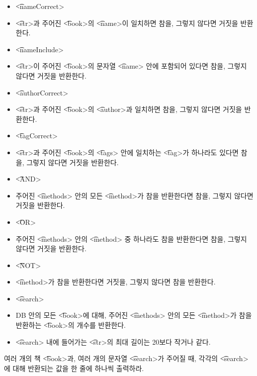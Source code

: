 \begin{itemize}
  \item \t{<nameCorrect>}
    \item \t{<str>}과 주어진 \t{<book>}의 \t{<name>}이 일치하면 참을, 그렇지 않다면 거짓을 반환한다.

  \item \t{<nameInclude>}
    \item \t{<str>}이 주어진 \t{<book>}의 문자열 \t{<name>} 안에 포함되어 있다면 참을, 그렇지 않다면 거짓을 반환한다.

  \item \t{<authorCorrect>}
    \item \t{<str>}과 주어진 \t{<book>}의 \t{<author>}과 일치하면 참을, 그렇지 않다면 거짓을 반환한다.

  \item \t{<tagCorrect>}
    \item \t{<str>}과 주어진 \t{<book>}의 \t{<tags>} 안에 일치하는 \t{<tag>}가 하나라도 있다면 참을, 그렇지 않다면 거짓을 반환한다.

  \item \t{<AND>}
    \item 주어진 \t{<methods>} 안의 모든 \t{<method>}가 참을 반환한다면 참을, 그렇지 않다면 거짓을 반환한다.

  \item \t{<OR>}
    \item 주어진 \t{<methods>} 안의 \t{<method>} 중 하나라도 참을 반환한다면 참을, 그렇지 않다면 거짓을 반환한다.

  \item \t{<NOT>}
    \item \t{<method>}가 참을 반환한다면 거짓을, 그렇지 않다면 참을 반환한다.

  \item \t{<search>}
    \item DB 안의 모든 \t{<book>}에 대해, 주어진 \t{<methods>} 안의 모든 \t{<method>}가 참을 반환하는 \t{<book>}의 개수를 반환한다.

  \item \t{<search>} 내에 들어가는 \t{<str>}의 최대 길이는 20보다 작거나 같다.
\end{itemize}

여러 개의 책 \t{<book>}과, 여러 개의 문자열 \t{<search>}가 주어질 때, 각각의 \t{<search>}에 대해 반환되는 값을 한 줄에 하나씩 출력하라.
